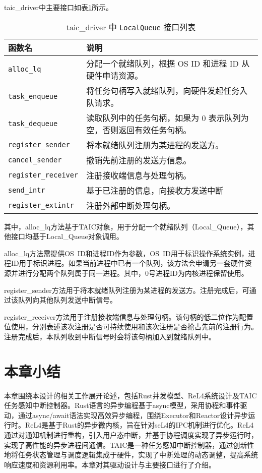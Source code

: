 taic\_driver中主要接口如表\ref{tab:taicdriver}所示。

\begin{table}[htbp]
\centering
\caption{taic\_driver 中 \texttt{LocalQueue} 接口列表}
\begin{tabular}{|l|p{10cm}|}
\hline
\textbf{函数名} & \textbf{说明} \\
\hline
\texttt{alloc\_lq} & 分配一个就绪队列，根据 OS ID 和进程 ID 从硬件申请资源。 \\
\hline
\texttt{task\_enqueue} & 将任务句柄写入就绪队列，向硬件发起任务入队请求。 \\
\hline
\texttt{task\_dequeue} & 读取队列中的任务句柄，如果为 0 表示队列为空，否则返回有效任务句柄。 \\
\hline
\texttt{register\_sender} & 将本就绪队列注册为某进程的发送方。 \\
\hline
\texttt{cancel\_sender} & 撤销先前注册的发送方信息。 \\
\hline
\texttt{register\_receiver} & 注册接收端信息与处理句柄。 \\
\hline
\texttt{send\_intr} & 基于已注册的信息，向接收方发送中断 \\
\hline
\texttt{register\_extintr} & 注册外部中断处理句柄。 \\
\hline
\end{tabular}
\label{tab:taicdriver}
\end{table}

其中，alloc\_lq方法基于TAIC对象，用于分配一个就绪队列（Local\_Queue），其他接口均基于Local\_Queue对象调用。

alloc\_lq方法需提供OS\ ID和进程ID作为参数，OS\ ID用于标识操作系统实例，进程ID用于标识进程。如果当前进程中已有一个队列，该方法会申请另一套硬件资源并进行分配两个队列属于同一进程。其中，0号进程ID为内核进程保留使用。

register\_sender方法用于将本就绪队列注册为某进程的发送方。注册完成后，可通过该队列向其他队列发送中断信号。

register\_receiver方法用于注册接收端信息与处理句柄。该句柄的低二位作为配置位使用，分别表述该次注册是否可持续使用和该次注册是否抢占先前的注册行为。注册完成后，本队列收到中断信号时会将该句柄加入到就绪队列中。






\section{本章小结}

本章围绕本设计的相关工作展开论述，包括Rust并发模型、ReL4系统设计及TAIC任务感知中断控制器。Rust语言的异步编程基于async模型，采用协程和事件驱动，通过async/await语法实现高效异步编程，围绕Executor和Reactor设计异步运行时。ReL4是基于Rust的异步微内核，旨在针对seL4的IPC机制进行优化。ReL4通过对通知机制进行重构，引入用户态中断，并基于协程调度实现了异步运行时，实现了高性能的异步进程间通信。TAIC是一种任务感知中断控制器，通过创新性地将任务状态管理与调度逻辑集成于硬件，实现了中断处理的动态调整，提高系统响应速度和资源利用率。本章对其驱动设计与主要接口进行了介绍。